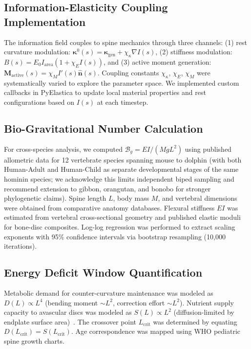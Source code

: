 \subsection{Information-Elasticity Coupling Implementation}

The information field couples to spine mechanics through three channels: (1) rest curvature modulation: $\bm{\kappa}^0(s) = \bm{\kappa}_{\mathrm{gen}} + \chi_\kappa \nabla I(s)$, (2) stiffness modulation: $B(s) = E_0 I_{\mathrm{area}} (1 + \chi_E I(s))$, and (3) active moment generation: $\mathbf{M}_{\mathrm{active}}(s) = \chi_M I'(s) \hat{\mathbf{n}}(s)$. Coupling constants $\chi_\kappa$, $\chi_E$, $\chi_M$ were systematically varied to explore the parameter space. We implemented custom callbacks in PyElastica to update local material properties and rest configurations based on $I(s)$ at each timestep.

\subsection{Bio-Gravitational Number Calculation}

For cross-species analysis, we computed $\mathcal{B}_g = EI/(MgL^2)$ using published allometric data for 12 vertebrate species spanning mouse to dolphin (with both Human-Adult and Human-Child as separate developmental stages of the same hominin species; we acknowledge this limits independent biped sampling and recommend extension to gibbon, orangutan, and bonobo for stronger phylogenetic claims). Spine length $L$, body mass $M$, and vertebral dimensions were obtained from comparative anatomy databases. Flexural stiffness $EI$ was estimated from vertebral cross-sectional geometry and published elastic moduli for bone-disc composites. Log-log regression was performed to extract scaling exponents with 95\% confidence intervals via bootstrap resampling (10,000 iterations).

\subsection{Energy Deficit Window Quantification}

Metabolic demand for counter-curvature maintenance was modeled as $D(L) \propto L^4$ (bending moment $\sim L^2$, correction effort $\sim L^2$). Nutrient supply capacity to avascular discs was modeled as $S(L) \propto L^2$ (diffusion-limited by endplate surface area)~\cite{urban2004nutrition}. The crossover point $L_{\mathrm{crit}}$ was determined by equating $D(L_{\mathrm{crit}}) = S(L_{\mathrm{crit}})$. Age correspondence was mapped using WHO pediatric spine growth charts.

